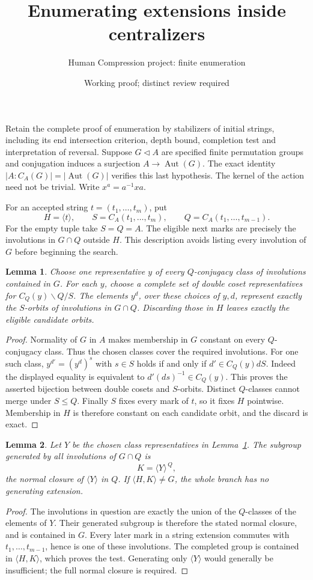 \documentclass[11pt,a4paper]{article}
\title{Enumerating extensions inside centralizers}
\author{Human Compression project: finite enumeration}
\date{Working proof; distinct review required}
\newtheorem{lemma}{Lemma}
\newcommand{\gen}[1]{\langle#1\rangle}
\begin{document}
\maketitle
Retain the complete proof of enumeration by stabilizers of initial
strings, including its end intersection criterion, depth bound,
completion test and interpretation of reversal. Suppose $G\lhd A$ are
specified finite permutation groups and conjugation induces a
surjection $A\to\operatorname{Aut}(G)$. The exact identity
$|A:C_A(G)|=|\operatorname{Aut}(G)|$ verifies this last hypothesis.
The kernel of the action need not be trivial. Write $x^a=a^{-1}xa$.

For an accepted string $t=(t_1,\ldots,t_m)$, put
\[
 H=\gen t,\qquad S=C_A(t_1,\ldots,t_m),\qquad
 Q=C_A(t_1,\ldots,t_{m-1}).
\]
For the empty tuple take $S=Q=A$. The eligible next marks are precisely
the involutions in $G\cap Q$ outside $H$. This description avoids
listing every involution of $G$ before beginning the search.

\begin{lemma}\label{orbits}
Choose one representative $y$ of every $Q$-conjugacy class of
involutions contained in $G$. For each $y$, choose a complete set of
double coset representatives for $C_Q(y)\backslash Q/S$.
The elements $y^d$, over these choices of $y,d$, represent exactly
the $S$-orbits of involutions in $G\cap Q$. Discarding those in $H$
leaves exactly the eligible candidate orbits.
\end{lemma}
\begin{proof}
Normality of $G$ in $A$ makes membership in $G$ constant on every
$Q$-conjugacy class. Thus the chosen classes cover the required
involutions. For one such class, $y^{d'}=(y^d)^s$ with $s\in S$
holds if and only if $d'\in C_Q(y)dS$. Indeed the displayed equality
is equivalent to $d'(ds)^{-1}\in C_Q(y)$. This proves the asserted
bijection between double cosets and $S$-orbits. Distinct
$Q$-classes cannot merge under $S\leq Q$. Finally $S$ fixes every
mark of $t$, so it fixes $H$ pointwise. Membership in $H$ is
therefore constant on each candidate orbit, and the discard is exact.
\end{proof}

\begin{lemma}\label{closure}
Let $Y$ be the chosen class representatives in Lemma~\ref{orbits}.
The subgroup generated by all involutions of $G\cap Q$ is
\[
                         K=\gen{Y}^{\,Q},
\]
the normal closure of $\gen Y$ in $Q$. If $\gen{H,K}\ne G$,
the whole branch has no generating extension.
\end{lemma}
\begin{proof}
The involutions in question are exactly the union of the $Q$-classes
of the elements of $Y$. Their generated subgroup is therefore the
stated normal closure, and is contained in $G$. Every later mark in
a string extension commutes with $t_1,\ldots,t_{m-1}$, hence is
one of these involutions. The completed group is contained in
$\gen{H,K}$, which proves the test. Generating only $\gen Y$
would generally be insufficient; the full normal closure is required.
\end{proof}
\end{document}
